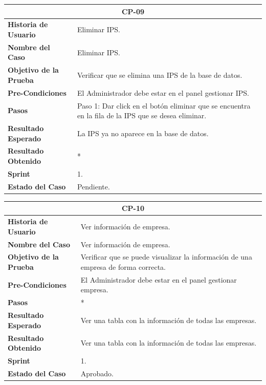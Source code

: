 \documentclass[12pt,a4paper]{article}
\begin{document}
\begin{center}
\begin{tabular}{|m{5cm}|m{9cm}|}
\hline
\multicolumn{2}{|c|}{\textbf{CP-09}} \\
\hline
\textbf{Historia de Usuario} & Eliminar IPS. \\
\hline
\textbf{Nombre del Caso} & Eliminar IPS. \\
\hline
\textbf{Objetivo de la Prueba} &  Verificar que se elimina una IPS de la base de datos.\\
\hline
\textbf{Pre-Condiciones} & El Administrador debe estar en el panel gestionar IPS. \\
\hline
\textbf{Pasos} & Paso 1: Dar click en el botón eliminar que se encuentra en la fila de la IPS que se desea eliminar. \\
\hline
\textbf{Resultado Esperado} & La IPS ya no aparece en la base de datos. \\
\hline
\textbf{Resultado Obtenido} & * \\
\hline
\textbf{Sprint} & 1. \\
\hline
\textbf{Estado del Caso} & Pendiente. \\
\hline
\end{tabular}
\vspace{5mm}

\begin{tabular}{|m{5cm}|m{9cm}|}
\hline
\multicolumn{2}{|c|}{\textbf{CP-10}} \\
\hline
\textbf{Historia de Usuario} & Ver información de empresa. \\
\hline
\textbf{Nombre del Caso} & Ver información de empresa. \\
\hline
\textbf{Objetivo de la Prueba} & Verificar que se puede visualizar la información de una empresa de forma correcta. \\
\hline
\textbf{Pre-Condiciones} & El Administrador debe estar en el panel gestionar empresa. \\
\hline
\textbf{Pasos} & * \\
\hline
\textbf{Resultado Esperado} & Ver una tabla con la información de todas las empresas. \\
\hline
\textbf{Resultado Obtenido} & Ver una tabla con la información de todas las empresas. \\
\hline
\textbf{Sprint} & 1. \\
\hline
\textbf{Estado del Caso} & Aprobado. \\
\hline
\end{tabular}
\vspace{5mm}


\end{center}
\end{document}
